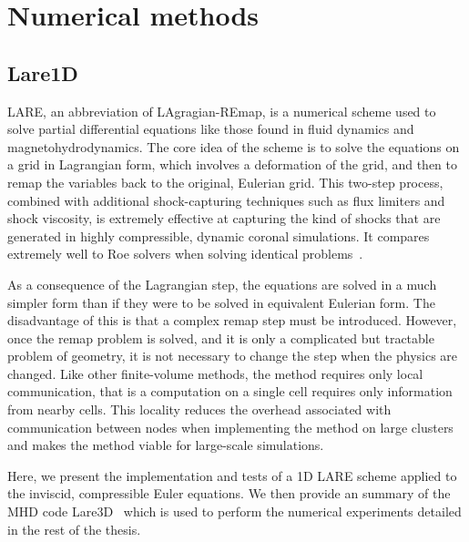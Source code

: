 \chapter{Numerical methods}

\label{chp:numerical_methods}

\graphicspath{{images/numerical_methods/}}

\section{Lare1D}

LARE, an abbreviation of LAgragian-REmap, is a numerical scheme used to solve partial differential equations like those found in fluid dynamics and magnetohydrodynamics. The core idea of the scheme is to solve the equations on a grid in Lagrangian form, which involves a deformation of the grid, and then to remap the variables back to the original, Eulerian grid. This two-step process, combined with additional shock-capturing techniques such as flux limiters and shock viscosity, is extremely effective at capturing the kind of shocks that are generated in highly compressible, dynamic coronal simulations. It compares extremely well to Roe solvers when solving identical problems~\cite{arberStaggeredGridLagrangian2001}.

As a consequence of the Lagrangian step, the equations are solved in a much simpler form than if they were to be solved in equivalent Eulerian form. The disadvantage of this is that a complex remap step must be introduced. However, once the remap problem is solved, and it is only a complicated but tractable problem of geometry, it is not necessary to change the step when the physics are changed. Like other finite-volume methods, the method requires only local communication, that is a computation on a single cell requires only information from nearby cells. This locality reduces the overhead associated with communication between nodes when implementing the method on large clusters and makes the method viable for large-scale simulations. 

Here, we present the implementation and tests of a 1D LARE scheme applied to the inviscid, compressible Euler equations. We then provide an summary of the MHD code Lare3D~\cite{arberStaggeredGridLagrangian2001} which is used to perform the numerical experiments detailed in the rest of the thesis. 

